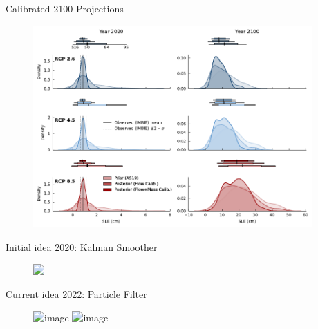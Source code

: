 \documentclass[hide notes,intlimits]{beamer}
\begin{document}
\begin{frame}{Calibrated 2100 Projections}
    \begin{figure}
      \includegraphics[height=7.75cm]{sle_pdf_w_obs_2020_2100}
    \end{figure}
\end{frame}


\begin{frame}{Initial idea 2020: Kalman Smoother}
  \begin{figure}
    \includegraphics<1->[width=\textwidth]{flowchart-kalman-smoother}
  \end{figure}
\end{frame}

\begin{frame}{Current idea 2022: Particle Filter}
  \begin{figure}
    \includegraphics<1>[width=\textwidth]{flowchart-particle-filter}
    \includegraphics<2>[width=\textwidth]{flowchart-particle-filter-tasks}
  \end{figure}
\end{frame}


  
  {
}

\begin{frame}{}
\end{frame}
\end{document}
